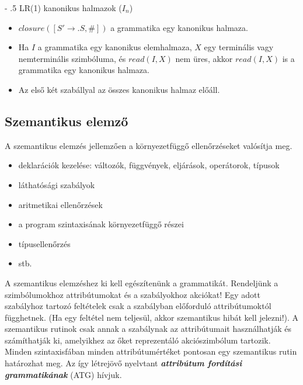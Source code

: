 \documentclass[12pt,margin=0px]{article}
\makeatletter
\renewcommand\paragraph{%
	\@startsection{paragraph}{4}{0mm}%
	{-\baselineskip}%
	{.5\baselineskip}%
	{\normalfont\normalsize\bfseries}}
\makeatother
\begin{document}
	\paragraph{LR(1) kanonikus halmazok ($ I_n $)}
	\begin{itemize}
		\item
		$ closure([S' \rightarrow .S, \#]) $ a grammatika egy kanonikus halmaza.
		\item
		Ha $ I $ a grammatika egy kanonikus elemhalmaza, $ X $ egy terminális vagy nemterminális szimbóluma, és $ read(I, X) $ nem üres, akkor $ read(I, X) $ is a grammatika egy kanonikus halmaza.
		\item
		Az első két szabállyal az összes kanonikus halmaz előáll.
	\end{itemize}
	
\subsection*{Szemantikus elemző}
	

	A szemantikus elemzés jellemzően a környezetfüggő ellenőrzéseket
	valósítja meg.
	
	\begin{itemize}
		\item
		deklarációk kezelése: változók, függvények, eljárások, operátorok, 	típusok
		\item
		láthatósági szabályok
		\item
			aritmetikai ellenőrzések
		\item
		a program szintaxisának környezetfüggő részei
		\item
		típusellenőrzés
		\item
		stb.
	\end{itemize}
	
	
    \noindent A szemantikus elemzéshez ki kell egészítenünk a grammatikát. Rendeljünk a szimbólumokhoz attribútumokat és a szabályokhoz akciókat! Egy adott szabályhoz tartozó feltételek csak a szabályban	előforduló attribútumoktól függhetnek.	(Ha egy feltétel nem teljesül, akkor szemantikus hibát kell	jelezni!). A szemantikus rutinok csak annak a szabálynak az	attribútumait használhatják és számíthatják ki, amelyikhez az őket reprezentáló akciószimbólum tartozik. Minden szintaxisfában minden attribútumértéket pontosan egy
	szemantikus rutin határozhat meg. Az így létrejövő nyelvtant \emph{\textbf{attribútum fordítási grammatikának}} (ATG) hívjuk.
\end{document}
